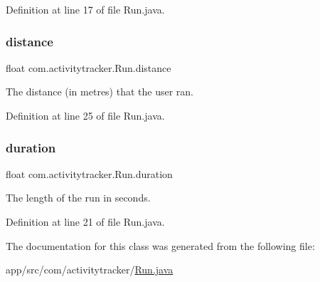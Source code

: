 Definition at line 17 of file Run.\+java.

\mbox{\label{classcom_1_1activitytracker_1_1_run_a7b4ca8c4ecea4da1653f03b8c8fc16a8}} 
\subsubsection{\texorpdfstring{distance}{distance}}
{\footnotesize\ttfamily float com.\+activitytracker.\+Run.\+distance\hspace{0.3cm}{\ttfamily [package]}}

The distance (in metres) that the user ran. 

Definition at line 25 of file Run.\+java.

\mbox{\label{classcom_1_1activitytracker_1_1_run_a5e38d293d29d4b65c9290ff4bee82e03}} 
\subsubsection{\texorpdfstring{duration}{duration}}
{\footnotesize\ttfamily float com.\+activitytracker.\+Run.\+duration\hspace{0.3cm}{\ttfamily [package]}}

The length of the run in seconds. 

Definition at line 21 of file Run.\+java.



The documentation for this class was generated from the following file\+:\begin{DoxyCompactItemize}
\item 
app/src/com/activitytracker/\mbox{\hyperlink{_run_8java}{Run.\+java}}\end{DoxyCompactItemize}
